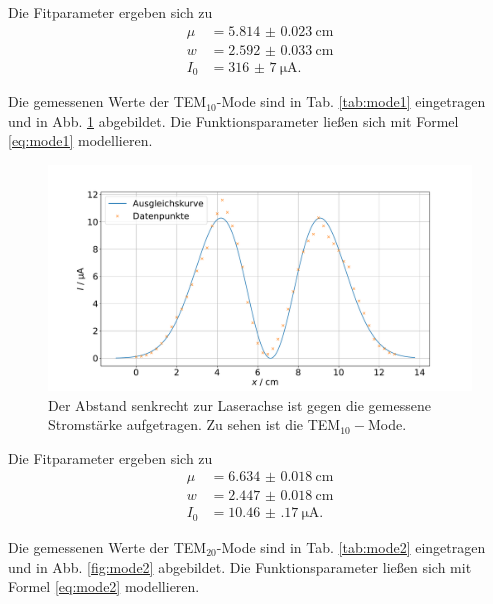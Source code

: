 Die Fitparameter ergeben sich zu 
\begin{align*}
    \mu &= \SI{5.814(23)}{\centi\meter} \\
    w &= \SI{2.592(33)}{\centi\meter} \\ 
    I_0 &= \SI{316(7)}{\micro\ampere}.
\end{align*}


Die gemessenen Werte der TEM$_{10}$-Mode sind in Tab. \ref{tab:mode1} eingetragen und in Abb. \ref{fig:mode1} abgebildet. 
Die Funktionsparameter ließen sich mit Formel \eqref{eq:mode1} modellieren.



\begin{figure}
    \centering
    \includegraphics[width=15cm]{plots/mode1.pdf}
    \caption{Der Abstand senkrecht zur Laserachse ist gegen die gemessene Stromstärke aufgetragen. Zu sehen ist die TEM$_{10}-$Mode.}
    \label{fig:mode1}
\end{figure}

Die Fitparameter ergeben sich zu 
\begin{align*}
    \mu &= \SI{6.634(18)}{\centi\meter} \\
    w &= \SI{2.447(18)}{\centi\meter} \\ 
    I_0 &= \SI{10.46(17)}{\micro\ampere}.
\end{align*}

Die gemessenen Werte der TEM$_{20}$-Mode sind in Tab. \ref{tab:mode2} eingetragen und in Abb. \ref{fig:mode2} abgebildet. 
Die Funktionsparameter ließen sich mit Formel \eqref{eq:mode2} modellieren.



